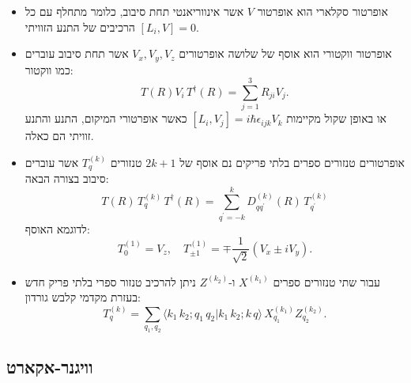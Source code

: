 \documentclass{tstextbook}
\begin{document}
\begin{summary}
  \begin{itemize}
    \item אופרטור סקלארי הוא אופרטור \(V\) אשר אינווריאנטי תחת סיבוב, כלומר מתחלף עם כל הרכיבים של התנע הזוויתי \([L_{i},V]=0\).
    \item אופרטור ווקטורי הוא אוסף של שלושה אופרטורים \(V_{x},V_{y},V_{z}\) אשר תחת סיבוב עוברים כמו ווקטור:
$$T(R)V_{i}\,T^{\dagger}(R)=\sum_{j=1}^{3}R_{j i}V_{j}.$$
או באופן שקול מקיימות \([L_{i},V_{j}]=i\hbar\epsilon_{ijk}V_{k}\) כאשר אופרטורי המיקום, התנע והתנע זוויתי הם כאלה.
    \item אופרטורים טנזורים ספרים בלתי פריקים נם אוסף של \(2k+1\) טנזורים \(T^{(k)}_{q}\) אשר עוברים סיבוב בצורה הבאה:
$$T(R)\,T_{q}^{(k)}\,T^{\dagger}(R)=\sum_{q^{\prime}=-k}^{k}D_{q q^{\prime}}^{(k)}(R)\,T_{q^{\prime}}^{(k)}$$
לדוגמא האוסף:
$$T_{0}^{(1)}=V_{z},\quad T_{\pm1}^{(1)}=\mp\frac{1}{\sqrt{2}}(V_{x}\pm i V_{y}).$$
    \item עבור שתי טנזורים ספרים \(X^{(k_{1})}\) ו-\(Z^{(k_{2})}\) ניתן להרכיב טנזור ספרי בלתי פריק חדש בעזרת מקדמי קלבש גורדון:
$$T_{q}^{(k)}=\sum_{q_{1},q_{2}}\langle k_{1}\,k_{2};q_{1}\,q_{2}|k_{1}\,k_{2};k\,q\rangle\,X_{q_{1}}^{(k_{1})}Z_{q_{2}}^{(k_{2})}.$$
  \end{itemize}
\end{summary}
\subsection{וויגנר-אקארט}
\end{document}

